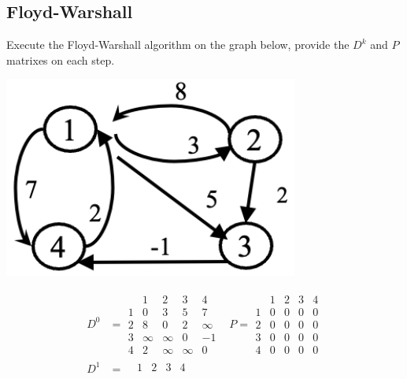 \documentclass{article}
\begin{document}
\begin{multicols*}{2}
    \subsection*{Floyd-Warshall}
    Execute the Floyd-Warshall algorithm on the graph below, provide the \(D^k\)
    and \(P\) matrixes on each step.
    \begin{center}
        \includegraphics[width=0.75\columnwidth]{floyd.png}
    \end{center}
    \begin{align*}
        D^0 & = \begin{array}{c|cccc}
                      & 1      & 2      & 3      & 4      \\
                    \hline
                    1 & 0      & 3      & 5      & 7      \\
                    2 & 8      & 0      & 2      & \infty \\
                    3 & \infty & \infty & 0      & -1     \\
                    4 & 2      & \infty & \infty & 0
                \end{array}
            & P = \begin{array}{c|cccc}
                        & 1 & 2 & 3 & 4 \\
                      \hline
                      1 & 0 & 0 & 0 & 0 \\
                      2 & 0 & 0 & 0 & 0 \\
                      3 & 0 & 0 & 0 & 0 \\
                      4 & 0 & 0 & 0 & 0
                  \end{array}                \\
        D^1 & = \begin{array}{c|cccc}
                      & 1      & 2      & 3 & 4  \\

\end{array}
\end{align*}
\end{multicols*}
\end{document}
